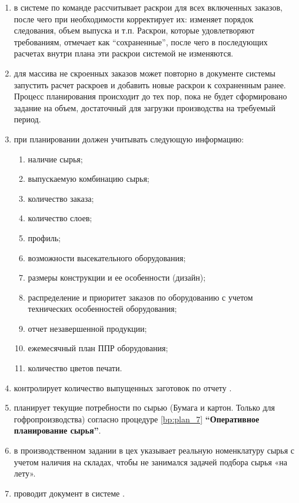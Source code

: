 \begin{enumerate}
\item \planner в системе \gofro по команде  рассчитывает раскрои для всех включенных заказов, после чего \planner при необходимости корректирует их: изменяет порядок следования, объем выпуска и т.п. Раскрои, которые удовлетворяют требованиям, \planner отмечает как “сохраненные”, после чего в последующих расчетах внутри плана эти раскрои системой \gofro не изменяются.
\item	 \planner для массива не скроенных заказов может повторно в документе  системы \gofro запустить расчет раскроев и добавить новые раскрои к сохраненным ранее. Процесс планирования происходит до тех пор, пока не будет сформировано задание на объем, достаточный для загрузки производства на требуемый период.
\item	\planner при планировании  должен учитывать следующую информацию:
\begin{enumerate}
    \item наличие сырья;
    \item выпускаемую комбинацию сырья;
    \item количество заказа;
    \item количество слоев;
    \item профиль;
    \item возможности высекательного оборудования;
    \item размеры конструкции и ее особенности (дизайн);
    \item распределение и приоритет заказов по оборудованию с учетом технических особенностей оборудования;
    \item отчет незавершенной продукции;
    \item ежемесячный план ППР оборудования;
    \item количество цветов печати.
\end{enumerate}
\item	\planner контролирует количество выпущенных заготовок по отчету .
\item	\planner планирует текущие потребности по сырью (Бумага и картон. Только для гофропроизводства) согласно процедуре  \ref{bp:plan_7} \textbf{“Оперативное планирование сырья”}.
\item 	\planner в производственном задании в цех  указывает реальную номенклатуру сырья с учетом наличия на складах, чтобы \gaoperator не занимался задачей подбора сырья «на лету».
\item	\planner проводит документ   в системе \gofro.


\end{enumerate}

